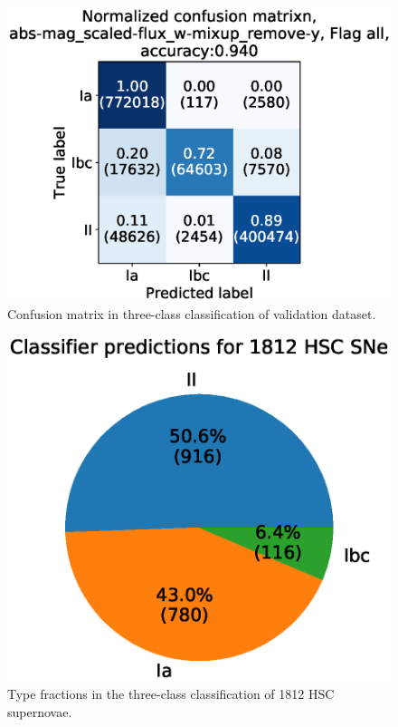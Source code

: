 \documentclass[useamsfonts]{pasj01}
\begin{document}
\begin{figure}[ht]
  \begin{center}
     \includegraphics[width=\columnwidth]{figures/13_CM_abs-mag_scaled-flux_w-mixup_remove-y_predictions_validation_2_Flagall_weighted.eps}
  \end{center}
  \caption{%
  Confusion matrix in three-class classification of validation dataset.
  }%
  \label{fig:h3_validation_CM}
\end{figure}
%
%
\begin{figure}[ht]
  \begin{center}
     \includegraphics[width=\columnwidth]{figures/14_piechart_hybrid.eps}
  \end{center}
  \caption{%
  Type fractions in the three-class classification of 1812 HSC supernovae.
  }%
  \label{fig:h3_class_ratio}
\end{figure}
%
%
\end{document}
